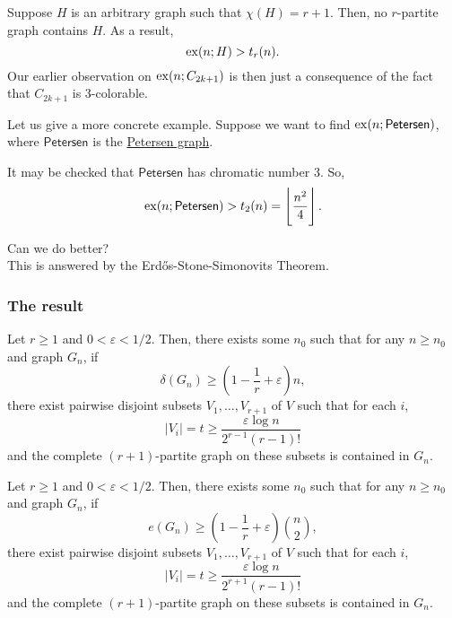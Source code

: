 \documentclass{article}
\begin{document}
			Suppose $H$ is an arbitrary graph such that $\chi(H) = r+1$. Then, no $r$-partite graph contains $H$. As a result,
			\[ \operatorname{ex}(n;H) > t_r(n). \]
			Our earlier observation on $\operatorname{ex}(n;C_{2k+1})$ is then just a consequence of the fact that $C_{2k+1}$ is $3$-colorable.

			Let us give a more concrete example. Suppose we want to find $\operatorname{ex}(n;\mathsf{Petersen})$, where $\mathsf{Petersen}$ is the \href{https://en.wikipedia.org/wiki/Petersen_graph}{Petersen graph}.


			It may be checked that $\mathsf{Petersen}$ has chromatic number $3$. So,
			\[ \operatorname{ex}(n;\mathsf{Petersen}) > t_2(n) = \left\lfloor \frac{n^2}{4} \right\rfloor. \]

			Can we do better?\\
			This is answered by the Erd\H{o}s-Stone-Simonovits Theorem.

		\subsubsection{The result}

			\begin{ftheo}
				\label{theo: erdos-stone v1}
				Let $r \ge 1$ and $0 < \varepsilon < 1/2$. Then, there exists some $n_0$ such that for any $n \ge n_0$ and graph $G_n$, if
				\begin{equation}
					\label{eqn: erdos-stone v1 condition}
					\delta(G_n) \ge \left(1 - \frac{1}{r} + \varepsilon\right)n,
				\end{equation}
				there exist pairwise disjoint subsets $V_1,\ldots,V_{r+1}$ of $V$ such that for each $i$,
				\[ |V_i| = t \ge \frac{\varepsilon \log n}{2^{r-1}(r-1)!} \]
				and the complete $(r+1)$-partite graph on these subsets is contained in $G_n$.
			\end{ftheo}

			\begin{ftheo}
				\label{theo: erdos-stone v2}
				Let $r \ge 1$ and $0 < \varepsilon < 1/2$. Then, there exists some $n_0$ such that for any $n \ge n_0$ and graph $G_n$, if
				\begin{equation}
					\label{eqn: erdos-stone v2 condition}
					e(G_n) \ge \left(1 - \frac{1}{r} + \varepsilon\right)\binom{n}{2},
				\end{equation}
				there exist pairwise disjoint subsets $V_1,\ldots,V_{r+1}$ of $V$ such that for each $i$,
				\[ |V_i| = t \ge \frac{\varepsilon \log n}{2^{r+1}(r-1)!} \]
				and the complete $(r+1)$-partite graph on these subsets is contained in $G_n$.
			\end{ftheo}
\end{document}
